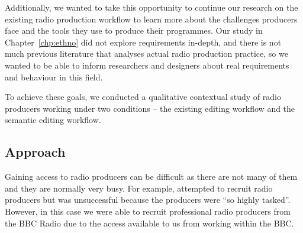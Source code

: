 Additionally, we wanted to take this opportunity to continue our research on the existing radio production workflow to
learn more about the challenges producers face and the tools they use to produce their programmes. Our study in
Chapter~\ref{chp:ethno} did not explore requirements in-depth, and there is not much previous literature that analyses
actual radio production practice, so we wanted to be able to inform researchers and designers about real requirements
and behaviour in this field.

To achieve these goals, we conducted a qualitative contextual study of radio producers working under two conditions --
the existing editing workflow and the semantic editing workflow.


\subsection{Approach}
Gaining access to radio producers can be difficult as there are not many of them and they are normally very busy.
For example, \citet{Kim2003} attempted to recruit radio producers but was unsuccessful because the producers were ``so
highly tasked''. However, in this case we were able to recruit professional radio producers from the BBC Radio due to
the access available to us from working within the BBC.

